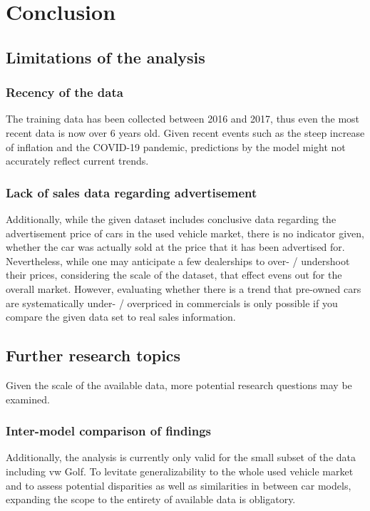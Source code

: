 \chapter{Conclusion}
\section{Limitations of the analysis}
\subsection{Recency of the data}
The training data has been collected between 2016 and 2017, thus even the most recent data
is now over 6 years old. Given recent events such as the steep increase of inflation
and the COVID-19 pandemic, predictions by the model might not accurately reflect current trends.

\subsection{Lack of sales data regarding advertisement}
Additionally, while the given dataset includes conclusive data regarding the advertisement price of cars in the used vehicle market,
there is no indicator given, whether the car was actually sold at the price that it has been advertised for. 
\newline
Nevertheless, while one may anticipate a few dealerships to over- / undershoot their prices,
considering the scale of the dataset, that effect evens out for the overall market.
However, evaluating whether there is a trend that pre-owned cars are systematically under- / overpriced in commercials
is only possible if you compare the given data set to real sales information.

\section{Further research topics}
Given the scale of the available data, more potential research questions may be examined. 

\subsection{Inter-model comparison of findings}
Additionally, the analysis is currently only valid for the small subset of the data including \ac{vw} Golf. 
To levitate generalizability to the whole used vehicle market and to assess potential disparities as well as similarities in between 
car models, expanding the scope to the entirety of available data is obligatory.  
